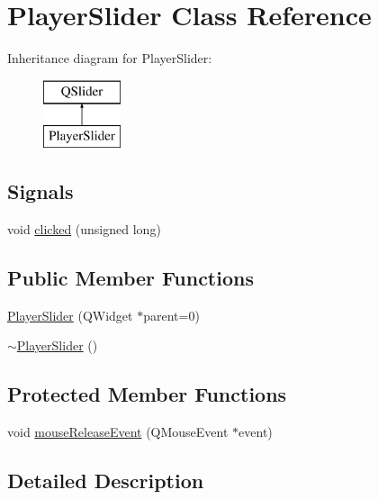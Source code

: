 \hypertarget{classPlayerSlider}{}\section{Player\+Slider Class Reference}
\label{classPlayerSlider}
Inheritance diagram for Player\+Slider\+:\begin{figure}[H]
\begin{center}
\leavevmode
\includegraphics[height=2.000000cm]{classPlayerSlider}
\end{center}
\end{figure}
\subsection*{Signals}
\begin{DoxyCompactItemize}
\item 
void \hyperlink{classPlayerSlider_abef7cf0a30593a00702809005603eaf8}{clicked} (unsigned long)
\end{DoxyCompactItemize}
\subsection*{Public Member Functions}
\begin{DoxyCompactItemize}
\item 
\hyperlink{classPlayerSlider_a84733b1398e44defe971cc1c34ea7651}{Player\+Slider} (Q\+Widget $\ast$parent=0)
\item 
\hyperlink{classPlayerSlider_a02cf20dfe74926a7a1be1017e9c4e926}{$\sim$\+Player\+Slider} ()
\end{DoxyCompactItemize}
\subsection*{Protected Member Functions}
\begin{DoxyCompactItemize}
\item 
void \hyperlink{classPlayerSlider_a29c91c586725aee0822b966f701562c3}{mouse\+Release\+Event} (Q\+Mouse\+Event $\ast$event)
\end{DoxyCompactItemize}


\subsection{Detailed Description}


